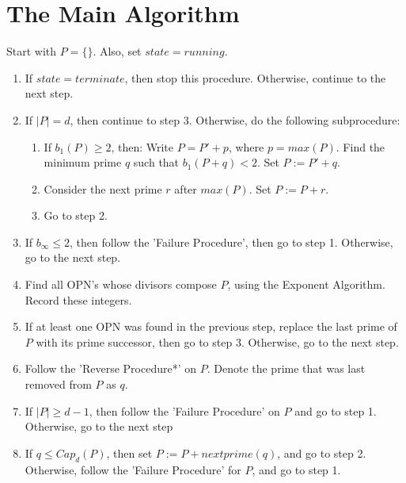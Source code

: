 \documentclass[../paper.tex]{subfiles}
\begin{document}
\section{The Main Algorithm}

Start with $P = \{\}$. Also, set $state = running$.
\begin{enumerate}[label*=\arabic*.]
  
  \item If $state = terminate$, then stop this procedure.
Otherwise, continue to the next step.

  \item If $|P| = d$, then continue to step 3. Otherwise, do the
following subprocedure:

  \begin{enumerate}[label*=\alph*.]

    \item If $b_{1}(P) \geq 2$, then: Write $P = P'
 + p$, where $p = max(P)$. Find the minimum prime $q$ such that
$b_1(P + q) < 2$. Set $P := P' + q$. 
    \item Consider the next prime $r$ after $max(P)$. Set $P := P
+ r$.
    \item Go to step 2.
 
  \end{enumerate}

  \item If $b_{\infty} \leq 2$, then follow the 'Failure
        Procedure', then go to step 1. Otherwise, go to the next
        step.

  \item Find all OPN's whose divisors compose $P$, using the
        Exponent Algorithm. Record these integers.

  \item If at least one OPN was found in the previous step,
        replace the last prime of $P$ with its prime successor,
        then go to step 3. Otherwise, go to the next step.

  \item Follow the 'Reverse Procedure*' on $P$. Denote
        the prime that was last removed from $P$ as $q$. 
        
  \item If $|P| \geq d - 1$, then follow the 'Failure Procedure'
        on $P$ and go to step 1. Otherwise, go to the next step

  \item If $q \leq Cap_d(P)$, then set $P := P + nextprime(q)$,
        and go to step 2. Otherwise, follow the 'Failure
        Procedure' for $P$, and go to step 1.

\end{enumerate}
\end{document}
